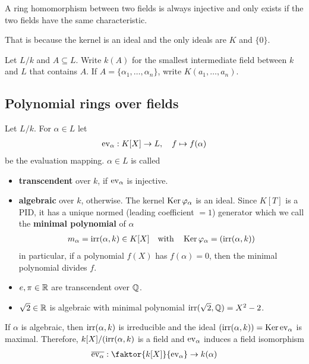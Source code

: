 \begin{prop}[]
  A ring homomorphism between two fields is always injective and only exists if the two fields have the same characteristic.
\end{prop}
That is because the kernel is an ideal and the only ideals are $K$ and $\{0\}$.

\begin{dfn}[]
Let $L/k$ and $A \subseteq L$.
Write $k(A)$ for the smallest intermediate field between $k$ and $L$ that contains $A$.
If $A = \{\alpha_{1}, \ldots, \alpha_{n}\}$, write $K(a_{1}, \ldots, a_{n})$.
\end{dfn}

\subsection{Polynomial rings over fields}
\begin{dfn}[]
  Let $L/k$. For $\alpha \in L$ let
  \begin{align*}
    \operatorname{ev}_{\alpha} : K[X] \to L, \quad f \mapsto f(\alpha)
  \end{align*}
  be the evaluation mapping. $\alpha \in L$ is called
  \begin{itemize}
    \item \textbf{transcendent} over $k$, if $\operatorname{ev}_{\alpha}$ is injective.
    \item \textbf{algebraic} over $k$, otherwise.
      The kernel $\operatorname{Ker} \varphi_{\alpha}$ is an ideal.
      Since $K[T]$ is a PID, it has a unique normed (leading coefficient $=1$) generator which we call the \textbf{minimal polynomial} of $\alpha$
      \begin{align*}
        m_{\alpha} = \text{irr}(\alpha,k) \in K[X]
        \quad \text{with} \quad \operatorname{Ker} \varphi_{\alpha} = (\text{irr}(\alpha,k))
      \end{align*}
      in particular, if a polynomial $f(X)$ has $f(\alpha) = 0$, then the minimal polynomial divides $f$.
  \end{itemize}
\end{dfn}

\begin{itemize}
  \item $e,\pi \in \mathbb{R}$ are transcendent over $\mathbb{Q}$.
  \item $\sqrt{2} \in \mathbb{R}$ is algebraic with minimal polynomial $\text{irr}(\sqrt{2},\mathbb{Q}) = X^{2} - 2$.
\end{itemize}

If $\alpha$ is algebraic, then $\operatorname{irr}(\alpha,k)$ is irreducible and the ideal $(\operatorname{irr}(\alpha,k)) = \operatorname{Ker} \operatorname{ev}_{\alpha}$ is maximal.
Therefore, $k[X]/(\operatorname{irr}(\alpha,k)$ is a field and $\operatorname{ev}_{\alpha}$ induces a field isomorphism
\begin{align*}
  \overline{\ev_{\alpha}} : \faktor{k[X]}{\ev_{\alpha}} \to k(\alpha)
\end{align*}



